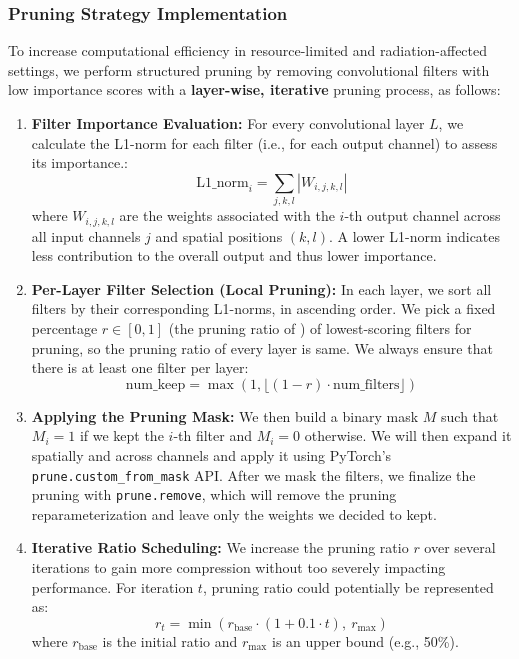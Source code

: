         \subsubsection{Pruning Strategy Implementation}
            To increase computational efficiency in resource-limited and radiation-affected settings, we perform structured pruning by removing convolutional filters with low importance scores with a \textbf{layer-wise, iterative} pruning process, as follows:
            
            \begin{enumerate}
            \item \textbf{Filter Importance Evaluation:} 
            For every convolutional layer \( L\), we calculate the L1-norm for each filter (i.e., for each output channel) to assess its importance.:
            \[
            \text{L1\_norm}_i = \sum_{j,k,l} |W_{i,j,k,l}|
            \]
            where \(W_{i,j,k,l}\) are the weights associated with the \(i\)-th output channel across all input channels \(j\) and spatial positions \((k,l)\). A lower L1-norm indicates less contribution to the overall output and thus lower importance.
            
            \item \textbf{Per-Layer Filter Selection (Local Pruning):} 
            In each layer, we sort all filters by their corresponding L1-norms, in ascending order. We pick a fixed percentage \( r \in [0, 1] \) (the pruning ratio of ) of lowest-scoring filters for pruning, so the pruning ratio of every layer is same. We always ensure that there is at least one filter per layer:
            \[
            \text{num\_keep} = \max(1, \lfloor (1 - r) \cdot \text{num\_filters} \rfloor)
            \]
            
            \item \textbf{Applying the Pruning Mask:} 
            We then build a binary mask \( M\) such that \( M_i = 1\) if we kept the \(i\)-th filter and \( M_i = 0\) otherwise. We will then expand it spatially and across channels and apply it using PyTorch’s \texttt{prune.custom\_from\_mask} API. After we mask the filters, we finalize the pruning with \texttt{prune.remove}, which will remove the pruning reparameterization and leave only the weights we decided to kept.
            
            \item \textbf{Iterative Ratio Scheduling:} 
            We increase the pruning ratio \( r\) over several iterations to gain more compression without too severely impacting performance. For iteration  \( t \), pruning ratio could potentially be represented as:
            \[
            r_t = \min \left( r_{\text{base}} \cdot (1 + 0.1 \cdot t),\ r_{\text{max}} \right)
            \]
            where \( r_{\text{base}} \) is the initial ratio and \( r_{\text{max}} \) is an upper bound (e.g., 50\%).
            \end{enumerate}
            
